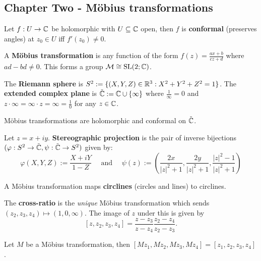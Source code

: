 \noindent\dotfill
\begin{multicols}{2}
\section*{Chapter Two - M\"obius transformations}

\begin{theorem}
Let $f:U\to\mathbb{C}$ be holomorphic with $U\subseteq\mathbb{C}$ open, then $f$ is \textbf{conformal} (preserves angles) at $z_0\in U$ iff $f'(z_0)\neq 0$.
\end{theorem}

\begin{definition}
A \textbf{M\"obius transformation} is any function of the form $f(z)=\frac{ax+b}{cz+d}$ where $ad-bd\neq0$. This forms a group $\mathcal{M}\cong \text{SL}(2;\mathbb{C})$.
\end{definition}

\begin{definition}
The \textbf{Riemann sphere} is $S^2:=\{(X,Y,Z)\in\mathbb{R}^3:X^2+Y^2+Z^2=1\}$. The \textbf{extended complex plane} is $\tilde{\mathbb{C}}:=\mathbb{C}\cup\{\infty\}$ where $\frac1\infty=0$ and $z\cdot\infty=\infty\cdot z = \infty=\frac10$ for any $z\in\mathbb{C}$.
\end{definition}

\begin{theorem}
M\"obius transformations are holomorphic and conformal on $\tilde{\mathbb{C}}$.
\end{theorem}

\begin{theorem}
Let $z=x+iy$. \textbf{Stereographic projection} is the pair of inverse bijections $(\varphi:S^2\to\tilde{\mathbb{C}},\psi:\tilde{\mathbb{C}}\to S^2)$ given by:
    \[
    \varphi(X,Y,Z) := \frac{X+iY}{1-Z}
    \quad\text{ and }\quad
    \psi(z):=\left(\frac{2x}{|z|^2+1},\frac{2y}{|z|^2+1},\frac{|z|^2-1}{|z|^2+1}\right)
    \]
\end{theorem}

\begin{theorem}[2.4.3]
A M\"obius transformation maps \textbf{circlines} (circles and lines) to circlines.
\end{theorem}

\begin{theorem}
The \textbf{cross-ratio} is the \textit{unique} M\"obius transformation which sends $(z_2,z_3,z_4)\mapsto(1,0,\infty)$. The image of $z$ under this is given by
    \[
    [z,z_2,z_3,z_4] = \frac{z-z_3}{z-z_4}\frac{z_2-z_4}{z_2-z_3}.
    \]
\end{theorem}

\begin{theorem}[2.5.7]
Let $M$ be a M\"obius transformation, then $[Mz_1,Mz_2,Mz_3,Mz_4]=[z_1,z_2,z_3,z_4]$.
\end{theorem}

\end{multicols}